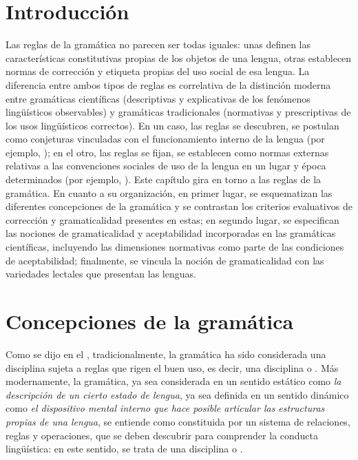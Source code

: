 
\section{Introducción}

Las reglas de la gramática no parecen ser todas iguales: unas definen las
características constitutivas propias de los objetos de una lengua, otras
establecen normas de corrección y etiqueta propias del uso social de esa
lengua. La diferencia entre ambos tipos de reglas es correlativa de la
distinción moderna entre gramáticas científicas (descriptivas y explicativas de
los fenómenos lingüísticos observables) y gramáticas tradicionales (normativas
y prescriptivas de los usos lingüísticos correctos). En un caso, las reglas se
descubren, se postulan como conjeturas vinculadas con el funcionamiento interno
de la lengua (por ejemplo, ); en el otro, las reglas se fijan, se establecen como normas
externas relativas a las convenciones sociales de uso de la lengua en un lugar
y época determinados (por ejemplo, ). Este capítulo gira en torno a las reglas de la gramática. En
cuanto a su organización, en primer lugar, se esquematizan las diferentes
concepciones de la gramática y se contrastan los criterios evaluativos de
corrección y gramaticalidad presentes en estas; en segundo lugar, se
especifican las nociones de gramaticalidad y aceptabilidad incorporadas en las
gramáticas científicas, incluyendo las dimensiones normativas como parte de las
condiciones de aceptabilidad; finalmente, se vincula la noción de
gramaticalidad con las variedades lectales que presentan las lenguas.

\section{Concepciones de la gramática}

Como se dijo en el , tradicionalmente, la gramática ha sido
considerada una disciplina sujeta a reglas que rigen el buen uso, es decir, una
disciplina  o . Más modernamente, la
gramática, ya sea considerada en un sentido estático como \textit{la
descripción de un cierto estado de lengua}, ya sea definida en un sentido
dinámico como \textit{el dispositivo mental interno que hace posible articular
las estructuras propias de una lengua}, se entiende como constituida por un
sistema de relaciones, reglas y operaciones, que se deben descubrir para
comprender la conducta lingüística: en este sentido, se trata de una disciplina
 o .

